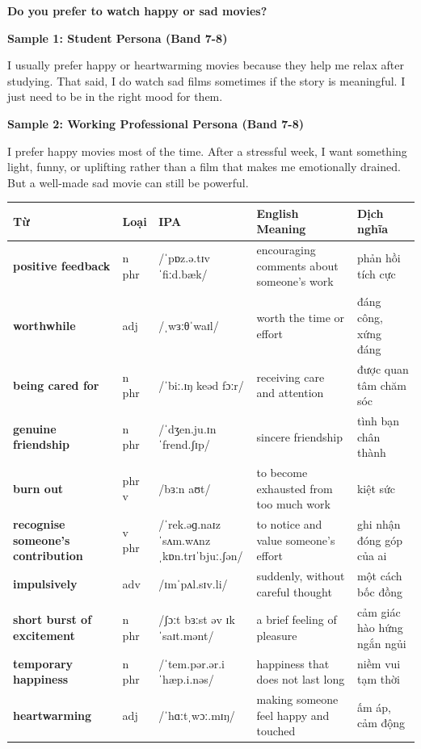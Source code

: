 \begin{ieltsquestion}
\textbf{Do you prefer to watch happy or sad movies?}
\end{ieltsquestion}
\textbf{Sample 1: Student Persona (Band 7-8)}

I usually prefer happy or heartwarming movies because they help me relax after studying. That said, I do watch sad films sometimes if the story is meaningful. I just need to be in the right mood for them.

\textbf{Sample 2: Working Professional Persona (Band 7-8)}

I prefer happy movies most of the time. After a stressful week, I want something light, funny, or uplifting rather than a film that makes me emotionally drained. But a well-made sad movie can still be powerful.

\separator


\vspace{0.8em}
\begin{center}
\renewcommand{\arraystretch}{1.65}
\begin{tabularx}{\textwidth}{|V{0.22\textwidth}|C{0.07\textwidth}|I{0.20\textwidth}|Y|V{0.18\textwidth}|}
\hline
{}
\textbf{Từ} & \textbf{Loại} & \textbf{IPA} & \textbf{English Meaning} & \textbf{Dịch nghĩa} \\
\hline
\textbf{positive feedback} & n phr & /ˈpɒz.ə.tɪv ˈfiːd.bæk/ & encouraging comments about someone's work & phản hồi tích cực \\ \hline
\textbf{worthwhile} & adj & /ˌwɜːθˈwaɪl/ & worth the time or effort & đáng công, xứng đáng \\ \hline
\textbf{being cared for} & n phr & /ˈbiː.ɪŋ keəd fɔːr/ & receiving care and attention & được quan tâm chăm sóc \\ \hline
\textbf{genuine friendship} & n phr & /ˈdʒen.ju.ɪn ˈfrend.ʃɪp/ & sincere friendship & tình bạn chân thành \\ \hline
\textbf{burn out} & phr v & /bɜːn aʊt/ & to become exhausted from too much work & kiệt sức \\ \hline
\textbf{recognise someone's contribution} & v phr & /ˈrek.əɡ.naɪz ˈsʌm.wʌnz ˌkɒn.trɪˈbjuː.ʃən/ & to notice and value someone's effort & ghi nhận đóng góp của ai \\ \hline
\textbf{impulsively} & adv & /ɪmˈpʌl.sɪv.li/ & suddenly, without careful thought & một cách bốc đồng \\ \hline
\textbf{short burst of excitement} & n phr & /ʃɔːt bɜːst əv ɪkˈsaɪt.mənt/ & a brief feeling of pleasure & cảm giác hào hứng ngắn ngủi \\ \hline
\textbf{temporary happiness} & n phr & /ˈtem.pər.ər.i ˈhæp.i.nəs/ & happiness that does not last long & niềm vui tạm thời \\ \hline
\textbf{heartwarming} & adj & /ˈhɑːtˌwɔː.mɪŋ/ & making someone feel happy and touched & ấm áp, cảm động \\ \hline
\end{tabularx}
\end{center}

